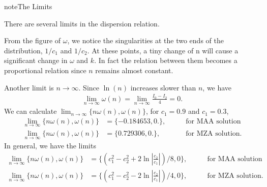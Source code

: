\documentclass[letterpaper,12pt,english]{sphinxmanual}
\begin{document}
\begin{sphinxadmonition}{note}{The Limits}

There are several limits in the dispersion relation.

From the figure of \(\omega\), we notice the singularities at the two ends of the distribution, \(1/c_1\) and \(1/c_2\). At these points, a tiny change of n will cause a significant change in \(\omega\) and \(k\). In fact the relation between them becomes a proportional relation since \(n\) remains almost constant.

Another limit is \(n\to \infty\). Since \(\ln(n)\) increases slower than \(n\), we have
\begin{equation*}
\begin{split}\lim_{n\to\infty}\omega(n) =\lim_{n\to\infty} \frac{ I_0-I_2 }{4} = 0.\end{split}
\end{equation*}
We can calculate \(\lim_{n\to \infty}\{n\omega(n),\omega(n)\}\), for \(c_1=0.9\) and \(c_1=0.3\),
\begin{equation*}
\begin{split}\lim_{n\to\infty}\{n\omega(n),\omega(n)\}  &= \{-0.184653, 0.  \}, &\qquad \text{for MAA solution}\\
\lim_{n\to\infty}\{n\omega(n),\omega(n)\}  &= \{0.729306, 0.  \}, &\qquad \text{for MZA solution}.\end{split}
\end{equation*}
In general, we have the limits
\begin{equation*}
\begin{split}\lim_{n\to\infty}\{n\omega(n),\omega(n)\}  &= \{(c_1^2-c_2^2 + 2\ln \left\vert\frac{c_2}{c_1}\right\vert )/8, 0  \}, &\qquad \text{for MAA solution} \\
\lim_{n\to\infty}\{n\omega(n),\omega(n)\}  &= \{ ( c_1^2-c_2^2 - 2\ln \left\vert \frac{c_2}{c_1} \right\vert )/4, 0  \}, &\qquad \text{for MZA solution}.\end{split}
\end{equation*}\end{sphinxadmonition}
\end{document}
